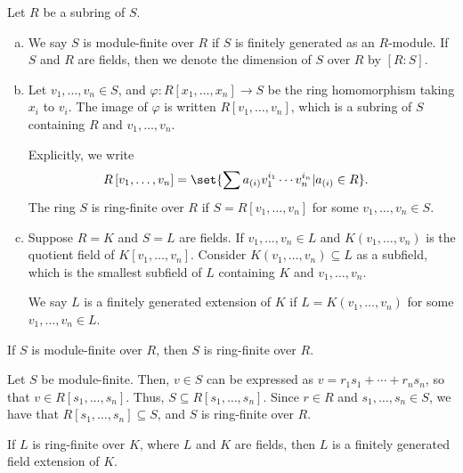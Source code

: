 \documentclass[10pt]{mypackage}
\begin{document}
\begin{definition}
  Let $R$ be a subring of $S$.
  \begin{enumerate}[(a)]
    \item We say $S$ is module-finite over $R$ if $S$ is finitely generated as an $R$-module. If $S$ and $R$ are  fields, then we denote the dimension of $S$ over $R$ by $\left[ R:S \right]$.
    \item Let $v_1,\dots,v_n\in S$, and $\varphi\colon R\left[ x_1,\dots,x_n \right]\rightarrow S$ be the ring homomorphism taking $x_i$ to $v_i$. The image of $\varphi$ is written $R\left[ v_1,\dots,v_n \right]$, which is a subring of $S$ containing $R$ and $v_1,\dots,v_n$.\newline

      Explicitly, we write
      \begin{align*}
        R\left[ v_1,\dots,v_n \right] &= \set{\sum a_{(i)}v_1^{i_1}\cdots v_n^{i_n} | a_{(i)} \in R}.
      \end{align*}
      The ring $S$ is ring-finite over $R$ if $S = R\left[ v_1,\dots,v_n \right]$ for some $v_1,\dots,v_n\in S$.
    \item Suppose $R = K$ and $S = L$ are fields. If $v_1,\dots,v_n\in L$ and $K\left( v_1,\dots,v_n \right)$ is the quotient field of $K\left[ v_1,\dots,v_n \right]$. Consider $K\left( v_1,\dots,v_n \right)\subseteq L$ as a subfield, which is the smallest subfield of $L$ containing $K$ and $v_1,\dots,v_n$.\newline

      We say $L$ is a finitely generated extension of $K$ if $L = K\left( v_1,\dots,v_n \right)$ for some $v_1,\dots,v_n\in L$.
  \end{enumerate}
\end{definition}
\begin{exercise}[Exercise 1.41]
  If $S$ is module-finite over $R$, then $S$ is ring-finite over $R$.
\end{exercise}
\begin{solution}
  Let $S$ be module-finite. Then, $v\in S$ can be expressed as $v = r_1s_1 + \cdots + r_ns_n$, so that $v\in R\left[ s_1,\dots,s_n \right]$. Thus, $S\subseteq R\left[ s_1,\dots,s_n \right]$. Since $r\in R$ and $s_1,\dots,s_n\in S$, we have that $R\left[ s_1,\dots,s_n \right]\subseteq S$, and $S$ is ring-finite over $R$.
\end{solution}
\begin{exercise}[Exercise 1.43]
  If $L$ is ring-finite over $K$, where $L$ and $K$ are fields, then $L$ is a finitely generated field extension of $K$.
\end{exercise}
\end{document}
